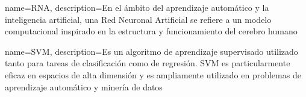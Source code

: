 {
	name=RNA,
	description={En el ámbito del aprendizaje automático y la inteligencia artificial, una Red Neuronal Artificial se refiere a un modelo computacional inspirado en la estructura y funcionamiento del cerebro humano} 
}

{
	name=SVM,
	description={Es un algoritmo de aprendizaje supervisado utilizado tanto para tareas de clasificación como de regresión. SVM es particularmente eficaz en espacios de alta dimensión y es ampliamente utilizado en problemas de aprendizaje automático y minería de datos} 
}
